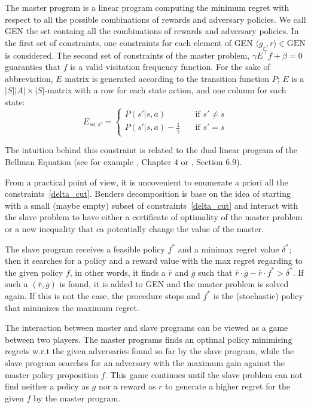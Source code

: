 \documentclass[runningheads,a4paper]{llncs}
\begin{document}
The master program is a linear program computing the minimum regret with respect to all the possible combinations of rewards and adversary policies. We call GEN the set containg all the combinations of rewards and adversary policies. 
In the first set of constraints, one constraints for each element of GEN $\langle g_r, r \rangle \in \text{GEN}$ is considered. 
The second set of constraints of the master problem, $\gamma E ^{\top}f+ \beta = 0$ guaranties that $f$ is a valid visitation frequency function. For the sake of abbreviation, $E$ matrix is generated according to the transition function $P$; $E$ is a $|S||A| \times |S|$-matrix with a row for each state action, and one column for each state:
\[   
E_{sa,s'} = 
     \begin{cases}
       P(s'|s, a) &\quad \text{if } s' \neq s\\
       P(s'|s, a) - \frac{1}{\gamma} &\quad \text{if } s' = s
     \end{cases}
\] 

The intuition behind this constraint is related to the dual linear program of the Bellman Equation (see for example \cite{Sutton1998}, Chapter $4$ or \citep{Puterman1994}, Section $6.9$). 

From a practical point of view, it is uncovenient to enumerate a priori all the constraints~\eqref{delta_cut}. Benders decomposition is base on the idea of starting with a small (maybe empty) subset of constraints~\eqref{delta_cut} and interact with the slave problem to have either a certificate of optimality of the master problem or a new inequality that ca potentially change the value of the master.

The slave program receives a feasible policy $f^*$ and a minimax regret value $\delta^*$; then it searches for a policy and a reward value with the max regret regarding to the given policy $f$, in other words, it finds a $\bar{r}$ and $\bar{g}$ such that $\bar{r} \cdot \bar{g}  - \bar{r}  \cdot f^* > \delta^*$. If such a $(\bar{r},\bar{g})$ is found, it is added to GEN and the master problem is solved again. If this is not the case, the procedure stops and $f^*$ is the (stochastic) policy that minimizes the maximum regret. 

The interaction between master and slave programs can be viewed as a game between two players. The master programs finds an optimal policy minimising regrets w.r.t the given adversaries found so far by the slave program, while the slave program searches for an adversary with the maximum gain against the master policy proposition $f$. This game continues until the slave problem can not find neither a policy as $g$ nor a reward as $r$ to generate a higher regret for the given $f$ by the master program.  
\end{document}
